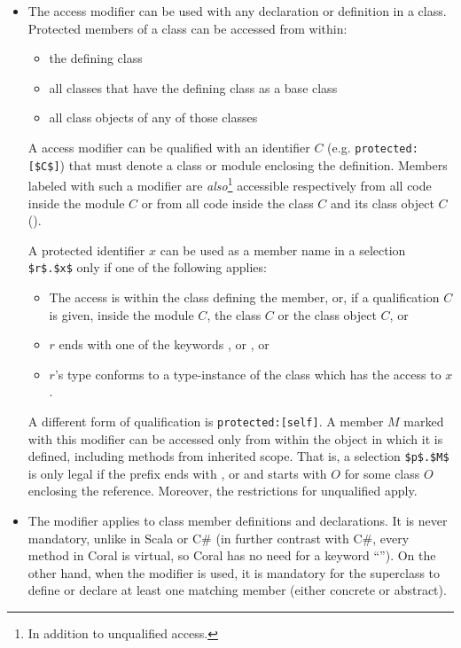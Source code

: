 \begin{itemize}
\item
The  access modifier can be used with any declaration or definition in a class. Protected members of a class can be accessed from within: 
\begin{itemize}
\item the defining class
\item all classes that have the defining class as a base class
\item all class objects of any of those classes
\end{itemize}

A  access modifier can be qualified with an identifier $C$ (e.g. \lstinline!protected:[$C$]!) that must denote a class or module enclosing the definition. Members labeled with such a modifier are {\em also}\footnote{In addition to unqualified  access.} accessible respectively from all code inside the module $C$ or from all code inside the class $C$ and its class object $C$ (). 

A protected identifier $x$ can be used as a member name in a selection \lstinline!$r$.$x$! only if one of the following applies: 
\begin{itemize}
\item The access is within the class defining the member, or, if a qualification $C$ is given, inside the module $C$, the class $C$ or the class object $C$, or
\item $r$ ends with one of the keywords ,  or , or
\item $r$'s type conforms to a type-instance of the class which has the access to $x$. 
\end{itemize}

A different form of qualification is \lstinline!protected:[self]!. A member $M$ marked with this modifier can be accessed only from within the object in which it is defined, including methods from inherited scope. That is, a selection \lstinline!$p$.$M$! is only legal if the prefix ends with ,  or  and starts with $O$ for some class $O$ enclosing the reference. Moreover, the restrictions for unqualified  apply. 

\item
The  modifier applies to class member definitions and declarations. It is never mandatory, unlike in Scala or C\# (in further contrast with C\#, every method in Coral is virtual, so Coral has no need for a keyword ``''). On the other hand, when the modifier is used, it is mandatory for the superclass to define or declare at least one matching member (either concrete or abstract). 


\end{itemize}
